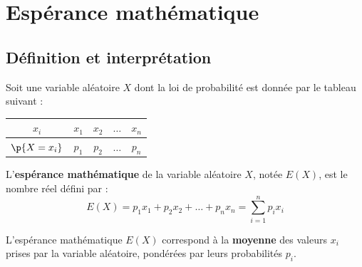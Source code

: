 \section{Espérance mathématique}

\subsection{Définition et interprétation}

\begin{defin}
	Soit une variable aléatoire $X$ dont la loi de probabilité est donnée par le tableau suivant :

	\begin{center}
		\begin{tabular}{|c|c|c|c|c|} \hline
			\ccg $x_i$       & $x_1$ & $x_2$ & $\dots$ & $x_n$ \\ \hline
			\ccg $\p{X=x_i}$ & $p_1$ & $p_2$ & $\dots$ & $p_n$ \\ \hline
		\end{tabular}
	\end{center}

	L'\textbf{espérance mathématique} de la variable aléatoire $X$, notée $E(X)$, est le nombre réel défini par :
	\[
		E(X) = p_{1}x_{1} + p_{2}x_{2} + \dots + p_{n}x_{n} = \sum_{i=1}^{n} p_i x_i
	\]
\end{defin}

\begin{remarque}
	L'espérance mathématique $E(X)$ correspond à la \textbf{moyenne} des valeurs $x_i$ prises par la variable aléatoire, pondérées par leurs probabilités $p_i$.
\end{remarque}

